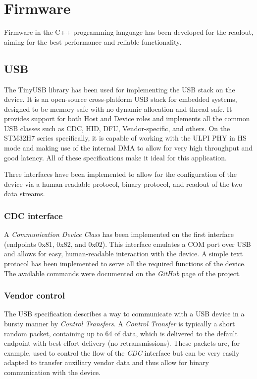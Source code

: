 \chapter{Firmware}
Firmware in the C++ programming language has been developed for the readout, aiming for the best performance and reliable functionality. 
\section{USB}
The TinyUSB library has been used for implementing the USB stack on the device. It is an open-source cross-platform USB stack for embedded systems, designed to be memory-safe with no dynamic allocation and thread-safe. It provides support for both Host and Device roles and implements all the common USB classes such as CDC, HID, DFU, Vendor-specific, and others. On the STM32H7 series specifically, it is capable of working with the ULPI PHY in HS mode and making use of the internal DMA to allow for very high throughput and good latency. \cite{tinyusb} All of these specifications make it ideal for this application.

Three interfaces have been implemented to allow for the configuration of the device via a human-readable protocol, binary protocol, and readout of the two data streams.
\subsection{CDC interface}
A \emph{Communication Device Class} has been implemented on the first interface (endpoints 0x81, 0x82, and 0x02). This interface emulates a COM port over USB \cite{usb_cdc_spec} and allows for easy, human-readable interaction with the device. A simple text protocol has been implemented to serve all the required functions of the device. The available commands were documented on the \emph{GitHub} page of the project. \cite{wojtacz_fastic_readout} 

\subsection{Vendor control}
The USB specification describes a way to communicate with a USB device in a bursty manner by \emph{Control Transfers}. A \emph{Control Transfer} is typically a short random packet, containing up to \SI{64}{\byte} of data, which is delivered to the default endpoint with best-effort delivery (no retransmissions). These packets are, for example, used to control the flow of the \emph{CDC} interface but can be very easily adapted to transfer auxiliary vendor data and thus allow for binary communication with the device. \cite{usb20_spec}

